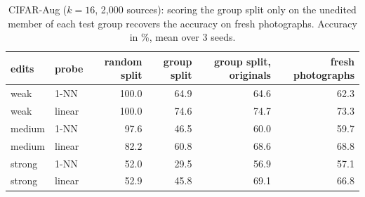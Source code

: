 \begin{table}[h]
\centering\footnotesize
\setlength{\tabcolsep}{4pt}
\caption{CIFAR-Aug ($k=16$, 2{,}000 sources): scoring the group split only on the unedited member of each test group recovers the accuracy on fresh photographs. Accuracy in \%, mean over 3 seeds.}
\label{tab:orig}
\begin{tabular}{@{}llrrrr@{}}
\toprule
edits & probe & random split & group split & group split, originals & fresh photographs \\
\midrule
weak & 1-NN & 100.0 & 64.9 & 64.6 & 62.3 \\
weak & linear & 100.0 & 74.6 & 74.7 & 73.3 \\
medium & 1-NN & 97.6 & 46.5 & 60.0 & 59.7 \\
medium & linear & 82.2 & 60.8 & 68.6 & 68.8 \\
strong & 1-NN & 52.0 & 29.5 & 56.9 & 57.1 \\
strong & linear & 52.9 & 45.8 & 69.1 & 66.8 \\
\bottomrule
\end{tabular}
\end{table}
